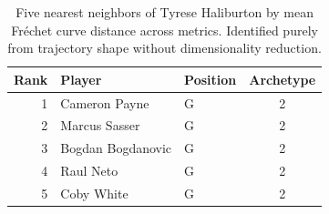 \begin{table}[htbp]
  \centering\small
  \begin{tabular}{rllc}
    \toprule
    Rank & Player & Position & Archetype \\
    \midrule
    1 & Cameron Payne & G & 2 \\
    2 & Marcus Sasser & G & 2 \\
    3 & Bogdan Bogdanovic & G & 2 \\
    4 & Raul Neto & G & 2 \\
    5 & Coby White & G & 2 \\
    \bottomrule
  \end{tabular}
  \caption{Five nearest neighbors of Tyrese Haliburton by mean Fr\'{e}chet curve distance across metrics. Identified purely from trajectory shape without dimensionality reduction.}
  \label{tab:Tyrese_Haliburton_frechet_curve_neighbors}
\end{table}

